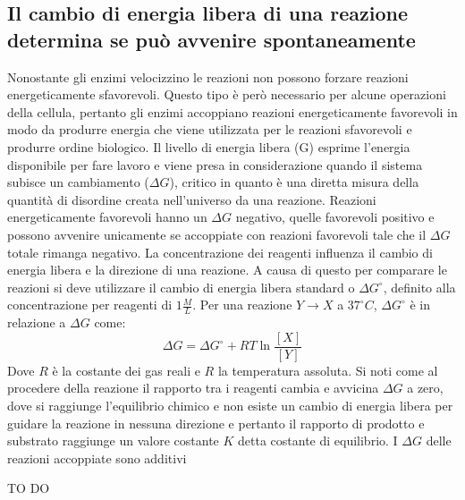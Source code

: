 \subsection{Il cambio di energia libera di una reazione determina se pu\`o avvenire spontaneamente}
Nonostante gli enzimi velocizzino le reazioni non possono forzare reazioni energeticamente sfavorevoli. Questo tipo \`e per\`o necessario per alcune operazioni della cellula, pertanto
gli enzimi accoppiano reazioni energeticamente favorevoli in modo da produrre energia che viene utilizzata per le reazioni sfavorevoli e produrre ordine biologico. Il livello di energia
libera (G) esprime l'energia disponibile per fare lavoro e viene presa in considerazione quando il sistema subisce un cambiamento ($\Delta G$), critico in quanto \`e una diretta misura
della quantit\`a di disordine creata nell'universo da una reazione. Reazioni energeticamente favorevoli hanno un $\Delta G$ negativo, quelle favorevoli positivo e possono avvenire 
unicamente se accoppiate con reazioni favorevoli tale che il $\Delta G$ totale rimanga negativo. La concentrazione dei reagenti influenza il cambio di energia libera e la direzione di 
una reazione. A causa di questo per comparare le reazioni si deve utilizzare il cambio di energia libera standard o $\Delta G^{\circ}$, definito alla concentrazione per reagenti di
$1\frac{M}{L}$. Per una reazione $Y\rightarrow X$ a $37^\circ C$, $\Delta G^\circ$ \`e in relazione a $\Delta G$ come:
$$\Delta G = \Delta G^\circ + RT\ln\dfrac{[X]}{[Y]}$$
Dove $R$ \`e la costante dei gas reali e $R$ la temperatura assoluta. Si noti come al procedere della reazione il rapporto tra i reagenti cambia e avvicina $\Delta G$ a zero, dove si 
raggiunge l'equilibrio chimico e non esiste un cambio di energia libera per guidare la reazione in nessuna direzione e pertanto il rapporto di prodotto e substrato raggiunge un valore
costante $K$ detta costante di equilibrio. I $\Delta G$ delle reazioni accoppiate sono additivi










\begin{Huge}
	TO DO
\end{Huge}

